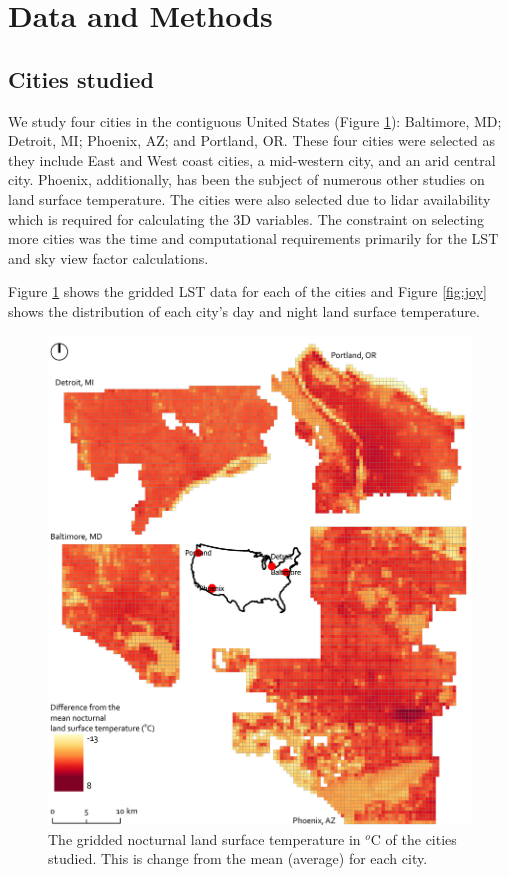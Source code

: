 \documentclass[final,3p,times,twocolumn,sort&compress]{elsarticle}
\begin{document}
\section{Data and Methods}
\subsection{Cities studied}

We study four cities in the contiguous United States (Figure \ref{fig:map}): Baltimore, MD; Detroit, MI; Phoenix, AZ; and Portland, OR. These four cities were selected as they include East and West coast cities, a mid-western city, and an arid central city. Phoenix, additionally, has been the subject of numerous other studies on land surface temperature. The cities were also selected due to lidar availability which is required for calculating the 3D variables. The constraint on selecting more cities was the time and computational requirements primarily for the LST and sky view factor calculations. 

Figure \ref{fig:map} shows the gridded LST data for each of the cities and Figure \ref{fig:joy} shows the distribution of each city's day and night land surface temperature. 

\begin{figure}
    \centering
    \includegraphics[width=\textwidth]{fig/report/map_nocturnal_lst.pdf}
    \caption{The gridded nocturnal land surface temperature in $^o$C of the cities studied. This is change from the mean (average) for each city.}
    \label{fig:map}
\end{figure}
\end{document}
